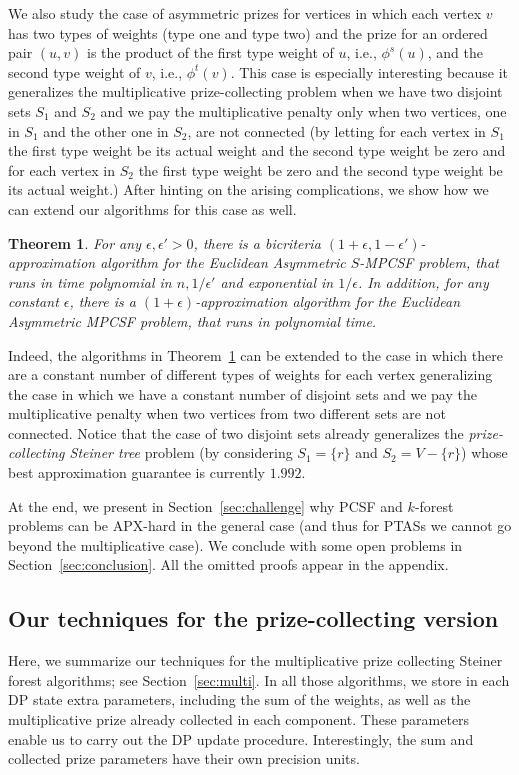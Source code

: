 \documentclass[extras,11pt]{article} \usepackage{fullpage}
\theoremstyle{mytheorem}
\newtheorem{theorem}{Theorem}
\newcommand{\eps}{\epsilon}
\newcommand{\prob}[1]{\textit{#1}}
\begin{document}
We also study the case of asymmetric prizes for vertices in which
each vertex $v$ has two types of weights (type one and type two) and the
prize for an ordered pair $(u,v)$ is the product of the first type
weight of $u$, i.e., $\phi^s(u)$, and the second type weight of $v$, i.e., $\phi^t(v)$.
This case is especially interesting because it generalizes the multiplicative
prize-collecting problem when we have two disjoint sets $S_1$ and
$S_2$ and we pay the multiplicative penalty only when two vertices,
one in $S_1$ and the other one in $S_2$, are not connected (by
letting for each vertex in $S_1$ the first type weight be its actual
weight and the second type weight be zero and for each vertex in $S_2$
the first type weight be zero and the second type weight be its actual
weight.) After hinting on the arising complications, we show how we
can extend our algorithms for this case as well.

\begin{theorem}\label{thm:asym-smpcsf}
 For any $\eps, \eps' > 0$, there is a bicriteria $(1+\eps, 1-\eps')$-approximation algorithm
 for the \prob{Euclidean Asymmetric $S$-MPCSF} problem,
  that runs in time polynomial
 in $n, 1/\eps'$ and exponential in $1/\eps$. In addition, for any constant $\eps$, there is a $(1+\eps)$-approximation algorithm
 for the \prob{Euclidean Asymmetric MPCSF} problem,
  that runs in  polynomial time.
\end{theorem}

Indeed, the algorithms in Theorem~\ref{thm:asym-smpcsf} can be
extended to the case in which there are a constant number of
different types of weights for each vertex generalizing the case in
which we have a constant number of disjoint sets and we pay the
multiplicative penalty when two vertices from two different sets are
not connected.
Notice that the case of two disjoint sets already generalizes
the \prob{prize-collecting Steiner tree} problem (by considering $S_1=\{r\}$ and $S_2=V-\{r\}$)
whose best approximation
guarantee is currently $1.992$.  

At the end, we present in Section~\ref{sec:challenge} why PCSF and
$k$-forest problems can be APX-hard in the general case (and thus
for PTASs we cannot go beyond the multiplicative case). We conclude
with some open problems in Section~\ref{sec:conclusion}. All the
omitted proofs appear in the appendix.




\subsection{Our techniques for the prize-collecting version}
Here, we summarize our techniques for the multiplicative prize collecting Steiner forest algorithms; see Section~\ref{sec:multi}.
In all those algorithms, we store in each DP state extra parameters,
including 
the sum of the weights, as well as the multiplicative prize already collected in each component.
These parameters enable us to carry out the DP update procedure.
Interestingly, the sum and collected prize parameters have their own precision units.
\end{document}
